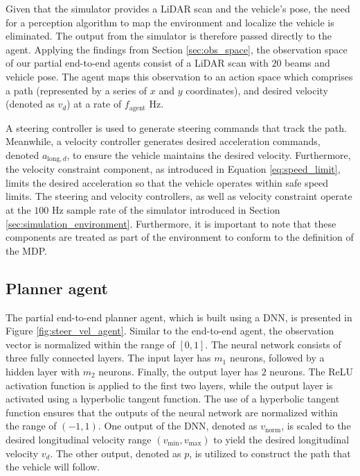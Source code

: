 Given that the simulator provides a LiDAR scan and the vehicle's pose, the need for a perception algorithm to map the environment and localize the vehicle is eliminated. 
The output from the simulator is therefore passed directly to the agent.
Applying the findings from Section \ref{sec:obs_space}, the observation space of our partial end-to-end agents consist of a LiDAR scan with $20$ beams and vehicle pose.
The agent maps this observation to an action space which comprises a path (represented by a series of $x$ and $y$ coordinates), and desired velocity (denoted as $v_{d}$) at a rate of $f_{\text{agent}}$ Hz. 


A steering controller is used to generate steering commands that track the path.
Meanwhile, a velocity controller generates desired acceleration commands, denoted $a_{\text{long},d}$, to ensure the vehicle maintains the desired velocity.
Furthermore, the velocity constraint component, as introduced in Equation \ref{eq:speed_limit}, limits the desired acceleration so that the vehicle operates within safe speed limits. 
The steering and velocity controllers, as well as velocity constraint operate at the $100$ Hz sample rate of the simulator introduced in Section \ref{sec:simulation_environment}.
Furthermore, it is important to note that these components are treated as part of the environment to conform to the definition of the MDP. 

\subsection{Planner agent}

The partial end-to-end planner agent, which is built using a DNN, is presented in Figure \ref{fig:steer_vel_agent}. 
Similar to the end-to-end agent, the observation vector is normalized within the range of $[0,1]$.
The neural network consists of three fully connected layers. The input layer has $m_1$ neurons, followed by a hidden layer with $m_2$ neurons. Finally, the output layer has $2$ neurons. 
The ReLU activation function is applied to the first two layers, while the output layer is activated using a hyperbolic tangent function. 
The use of a hyperbolic tangent function ensures that the outputs of the neural network are normalized within the range of $(-1, 1)$.
One output of the DNN, denoted as $v_{\text{norm}}$, is scaled to the desired longitudinal velocity range $(v_{\text{min}}, v_{\text{max}})$ to yield the desired longitudinal velocity $v_{d}$. 
The other output, denoted as $p$, is utilized to construct the path that the vehicle will follow.


